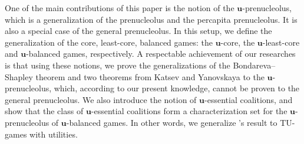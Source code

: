 \documentclass[a4paper,12pt]{article}
\theoremstyle{definition}
\theoremstyle{remark}
\begin{document}
 
 


One of the main contributions of this paper is the notion of the $\mathbf{u}$-prenucleolus, which is a generalization of the prenucleolus and the percapita prenucleolus. It is also a special case of the general prenucleolus. In this setup, we define the generalization of the core, least-core, balanced games: the $\mathbf{u}$-core, the $\mathbf{u}$-least-core and $\mathbf{u}$-balanced games, respectively. A respectable achievement of our researches is that using these notions, we prove the generalizations of the Bondareva--Shapley theorem and two theorems from Katsev and Yanovskaya to the $ \mathbf{u}$-prenucleolus, which, according to our present knowledge, cannot be proven to the general prenucleolus. %
We also introduce the notion of $\mathbf{u}$-essential coalitions, and show that the class of $\mathbf{u}$-essential coalitions form  a characterization set for the $\mathbf{u}$-prenucleolus of $\mathbf{u}$-balanced games. In other words, we generalize \citet{Huberman1980}'s result to TU-games with utilities. 
\end{document}
